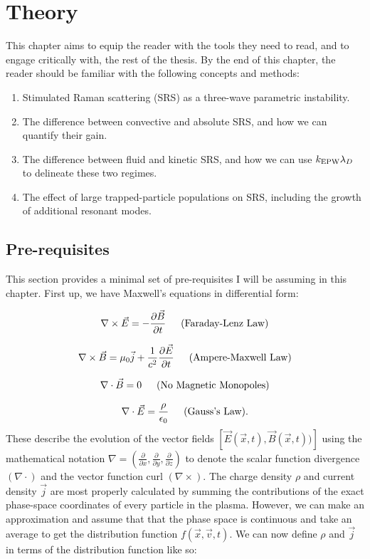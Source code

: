 \chapter{Theory}
\label{chp:theory}

This chapter aims to equip the reader with the tools they need to read, and to engage critically with, the rest of the thesis. By the end of this chapter, the reader should be familiar with the following concepts and methods:
\begin{enumerate}
	\item Stimulated Raman scattering (\acrshort{SRS}) as a three-wave parametric instability.
	\item The difference between convective and absolute SRS, and how we can quantify their gain.
	\item The difference between fluid and kinetic SRS, and how we can use $k_\mathrm{EPW}\lambda_D$ to delineate these two regimes.
	\item The effect of large trapped-particle populations on SRS, including the growth of additional resonant modes.
\end{enumerate}


\section{Pre-requisites}
This section provides a minimal set of pre-requisites I will be assuming in this chapter. First up, we have Maxwell's equations in differential form:

\begin{equation}
\nabla \times \vec{E}=-\frac{\partial \vec{B}}{\partial t} \text{\,\,\,\,\,\,\,\,\,(Faraday-Lenz Law)}
\end{equation}

\begin{equation}
\nabla \times \vec{B}=\mu_{0} \vec{j}+\frac{1}{c^{2}} \frac{\partial \vec{E}}{\partial t}
\text{\,\,\,\,\,\,\,\,\,(Ampere-Maxwell Law)}
\end{equation}

\begin{equation}
\nabla \cdot \vec{B}=0 \text{\,\,\,\,\,\,\,\,\,(No Magnetic Monopoles)}
\end{equation}

\begin{equation}
\nabla \cdot \vec{E}=\frac{\rho}{\epsilon_{0}} \text{\,\,\,\,\,\,\,\,\,(Gauss's Law)}.
\end{equation} These describe the evolution of the vector fields $[\vec{E}(\vec{x},t),\vec{B}(\vec{x},t))]$ using the mathematical notation $\nabla = \left(\frac{\partial}{\partial x},\frac{\partial}{\partial y},\frac{\partial}{\partial z} \right)$ to denote the scalar function divergence $(\nabla \cdot)$ and the vector function curl $(\nabla \times)$. The charge density $\rho$ and current density $\vec{j}$ are most properly calculated by summing the contributions of the exact phase-space coordinates of every particle in the plasma. However, we can make an approximation and assume that that the phase space is continuous and take an average to get the distribution function $f(\vec{x},\vec{v},t)$. We can now define $\rho$ and $\vec{j}$ in terms of the distribution function like so:

